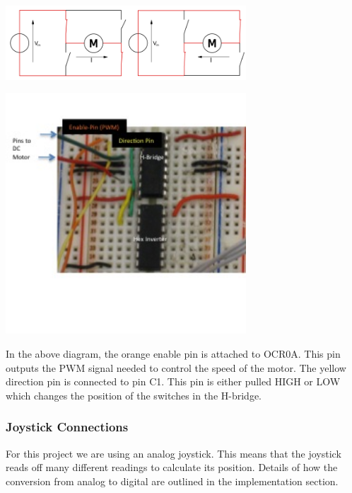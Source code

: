   \begin{minipage}{6.5in}
    \includegraphics[width=90mm]{imageSources/hBridgeConnect1.png}
  \centering
  \label{hBridgeConnect1}
\end{minipage}


  \begin{center}
    \includegraphics[width=90mm]{imageSources/hBridgeConnect2.png}
  \end{center}
  \label{hBridgeConnect2}


In the above diagram, the orange enable pin is attached to OCR0A. This pin outputs the PWM signal needed to control the speed of the motor.  The yellow direction pin is connected to pin C1. This pin is either pulled HIGH or LOW which changes the position of the switches in the H-bridge.

\subsubsection{Joystick Connections}

For this project we are using an analog joystick. This means that  the joystick reads off many different readings to calculate its position. Details of how the conversion from analog to digital are outlined in the implementation section.

